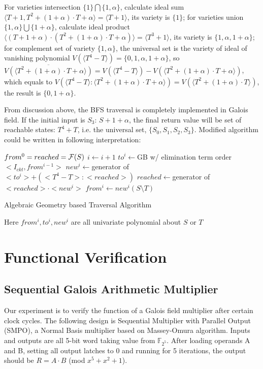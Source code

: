 For varieties intersection $\{1\}\bigcap\{1, \alpha\}$, calculate ideal sum $\langle T+1, T^2 + (1+\alpha)\cdot T+\alpha\rangle  = \langle T+1\rangle $,
its variety is $\{1\}$; for varieties union $\{1,\alpha\}\bigcup\{1+\alpha\}$, calculate
ideal product $\langle (T+1+\alpha)\cdot(T^2 + (1+\alpha)\cdot T+\alpha)\rangle  = \langle T^3 + 1\rangle $, its variety
is $\{1, \alpha, 1+\alpha\}$; for complement set of variety $\{1, \alpha\}$, the universal set is
the variety of ideal of vanishing polynomial $V(\langle T^4-T\rangle ) = \{0,1,\alpha,1+\alpha\}$,
so $\overline{V(\langle T^2 + (1+\alpha)\cdot T+\alpha\rangle )} = V(\langle T^4-T\rangle ) - V(\langle T^2 + (1+\alpha)\cdot T+\alpha\rangle )$,
which equals to $V(\langle T^4-T\rangle :\langle T^2 + (1+\alpha)\cdot T+\alpha\rangle ) = V(\langle T^2+(1+\alpha)\cdot T\rangle )$,
the result is $\{0,1+\alpha\}$.

From discussion above, the BFS traversal is completely implemented in Galois field.
If the initial input is $S_3$: $S + 1 + \alpha$, the final return value will be set of
reachable states: $T^4 + T$, i.e. the universal set, $\{S_0, S_1, S_2, S_3\}$. Modified algorithm could be
written in following interpretation:

\begin{algorithm}[hbt]
\SetAlgoNoLine

  $from^0 = reached = {\mathcal{F}}(S)$\;
  {
  	$i \gets i + 1$\;
	$to^i \gets$GB w/ elimination term order$<I_{ckt}, from^{i-1}>$\;
	$new^i \gets $generator of $<to^i> + (<T^4-T>:<reached>)$\;
  	$reached \gets $generator of $<reached> \cdot <new^i>$\;
	$from^i \gets new^i(S\setminus T)$\;
  }
\caption {Algebraic Geometry based Traversal Algorithm}\label{alg:modified}
\end{algorithm}

Here $from^i, to^i, new^i$ are all univariate polynomial about $S$ or $T$



\section{Functional Verification}
\subsection{Sequential Galois Arithmetic Multiplier}
Our experiment is to verify the function of a Galois field multiplier after certain clock cycles.
The following design is Sequential Multiplier with Parallel Output (SMPO),
a Normal Basis multiplier based on Massey-Omura algorithm. Inputs and outputs
are all 5-bit word taking value from ${\mathbb F}_{2^5}$. After loading operands
 A and B, setting all output latches to 0 and running for 5 iterations, the 
output should be $R = A\cdot B$ (mod $x^5 + x^2 + 1$).

